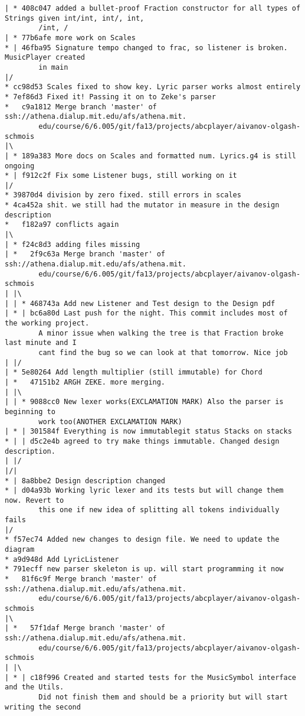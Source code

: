 \documentclass[12pt]{book}
\begin{document}
\begin{Verbatim}
| * 408c047 added a bullet-proof Fraction constructor for all types of Strings given int/int, int/, int, 
        /int, /
| * 77b6afe more work on Scales
* | 46fba95 Signature tempo changed to frac, so listener is broken. MusicPlayer created 
        in main
|/
* cc98d53 Scales fixed to show key. Lyric parser works almost entirely
* 7ef86d3 Fixed it! Passing it on to Zeke's parser
*   c9a1812 Merge branch 'master' of ssh://athena.dialup.mit.edu/afs/athena.mit.
        edu/course/6/6.005/git/fa13/projects/abcplayer/aivanov-olgash-schmois
|\
| * 189a383 More docs on Scales and formatted num. Lyrics.g4 is still ongoing
* | f912c2f Fix some Listener bugs, still working on it
|/
* 39870d4 division by zero fixed. still errors in scales
* 4ca452a shit. we still had the mutator in measure in the design description
*   f182a97 conflicts again
|\
| * f24c8d3 adding files missing
| *   2f9c63a Merge branch 'master' of ssh://athena.dialup.mit.edu/afs/athena.mit.
        edu/course/6/6.005/git/fa13/projects/abcplayer/aivanov-olgash-schmois
| |\
| | * 468743a Add new Listener and Test design to the Design pdf
| * | bc6a80d Last push for the night. This commit includes most of the working project. 
        A minor issue when walking the tree is that Fraction broke last minute and I 
        cant find the bug so we can look at that tomorrow. Nice job
| |/
| * 5e80264 Add length multiplier (still immutable) for Chord
| *   47151b2 ARGH ZEKE. more merging.
| |\
| | * 9088cc0 New lexer works(EXCLAMATION MARK) Also the parser is beginning to 
        work too(ANOTHER EXCLAMATION MARK)
| * | 301584f Everything is now immutablegit status Stacks on stacks
* | | d5c2e4b agreed to try make things immutable. Changed design description.
| |/
|/|
* | 8a8bbe2 Design description changed
* | d04a93b Working lyric lexer and its tests but will change them now. Revert to 
        this one if new idea of splitting all tokens individually fails
|/
* f57ec74 Added new changes to design file. We need to update the diagram
* a9d948d Add LyricListener
* 791ecff new parser skeleton is up. will start programming it now
*   81f6c9f Merge branch 'master' of ssh://athena.dialup.mit.edu/afs/athena.mit.
        edu/course/6/6.005/git/fa13/projects/abcplayer/aivanov-olgash-schmois
|\
| *   57f1daf Merge branch 'master' of ssh://athena.dialup.mit.edu/afs/athena.mit.
        edu/course/6/6.005/git/fa13/projects/abcplayer/aivanov-olgash-schmois
| |\
| * | c18f996 Created and started tests for the MusicSymbol interface and the Utils. 
        Did not finish them and should be a priority but will start writing the second 

\end{Verbatim}
\end{document}
